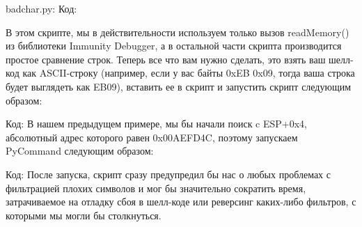 \documentclass[12pt, a4paper, oneside]{book}
\begin{document}
badchar.py:
Код:













В этом скрипте, мы в действительности используем только вызов readMemory() из библиотеки Immunity Debugger, а в остальной части скрипта производится простое сравнение строк. Теперь все что вам нужно сделать, это взять ваш шелл-код как ASCII-строку (например, если у вас байты 0xEB 0x09, тогда ваша строка будет выглядеть как EB09), вставить ее в скрипт и запустить скрипт следующим образом:

Код:
В нашем предыдущем примере, мы бы начали поиск c ESP+0x4, абсолютный адрес которого равен 0x00AEFD4C, поэтому запускаем PyCommand следующим образом:

Код:
После запуска, скрипт сразу предупредил бы нас о любых проблемах с фильтрацией плохих символов и мог бы значительно сократить время, затрачиваемое на отладку сбоя в шелл-коде или реверсинг каких-либо фильтров, с которыми мы могли бы столкнуться.
\end{document}
